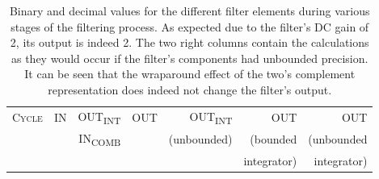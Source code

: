 \begin{table}
    \centering
    \caption[CIC Filter Example: States for 16 Cycles]{%
        Binary and  decimal values  for the  different filter  elements during
        various  stages  of the  filtering  process. As  expected due  to  the
        filter's DC  gain of  \num{2}, its output  is indeed  \num{2}. The two
        right  columns contain  the calculations  as they  would occur  if the
        filter's components had  unbounded precision. It can be  seen that the
        wraparound effect  of the two's complement  representation does indeed
        not change the filter's output.%
    }
    \label{tab:cic_simu:cic_filter_states}
    \ttfamily
    \begin{tabular}{rrrr|rrr}
        \toprule
        \scshape Cycle                   &
        \scshape IN                      &
        \scshape OUT\textsubscript{INT}  &
        \scshape OUT                     &
        \scshape OUT\textsubscript{INT}  &
        \scshape OUT                     &
        \scshape OUT                     \\

        &
        &
        \scshape IN\textsubscript{COMB} &
        &
        (unbounded) &
        (bounded    &
        (unbounded  \\

        &
        &
        &
        &
        &
        integrator) &
        integrator) \\


\end{tabular}
\end{table}
